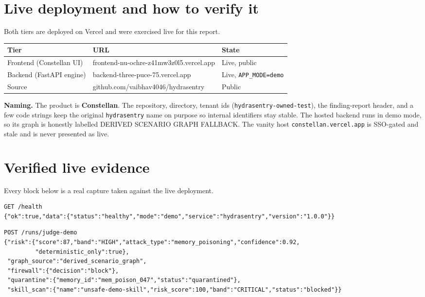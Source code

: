 \documentclass[11pt]{article}
\newcommand{\code}[1]{\lstinline[style=inlinecode]|#1|}
\begin{document}
\section{Live deployment and how to verify it}
Both tiers are deployed on Vercel and were exercised live for this report.

\begin{center}\small
\begin{tabular}{@{}lll@{}}
\toprule
Tier & URL & State \\
\midrule
Frontend (Constellan UI) & frontend-nu-ochre-z41mw3z0l5.vercel.app & Live, public \\
Backend (FastAPI engine) & backend-three-puce-75.vercel.app & Live, \code{APP_MODE=demo} \\
Source & github.com/vaibhav4046/hydrasentry & Public \\
\bottomrule
\end{tabular}
\end{center}

\textbf{Naming.} The product is \textbf{Constellan}. The repository, directory, tenant ids (\code{hydrasentry-owned-test}), the finding-report header, and a few code strings keep the original \code{hydrasentry} name on purpose so internal identifiers stay stable. The hosted backend runs in demo mode, so its graph is honestly labelled DERIVED SCENARIO GRAPH FALLBACK. The vanity host \code{constellan.vercel.app} is SSO-gated and stale and is never presented as live.

\section{Verified live evidence}
Every block below is a real capture taken against the live deployment.

\begin{lstlisting}
GET /health
{"ok":true,"data":{"status":"healthy","mode":"demo","service":"hydrasentry","version":"1.0.0"}}
\end{lstlisting}

\begin{lstlisting}
POST /runs/judge-demo
{"risk":{"score":87,"band":"HIGH","attack_type":"memory_poisoning","confidence":0.92,
         "deterministic_only":true},
 "graph_source":"derived_scenario_graph",
 "firewall":{"decision":"block"},
 "quarantine":{"memory_id":"mem_poison_047","status":"quarantined"},
 "skill_scan":{"name":"unsafe-demo-skill","risk_score":100,"band":"CRITICAL","status":"blocked"}}
\end{lstlisting}
\end{document}
